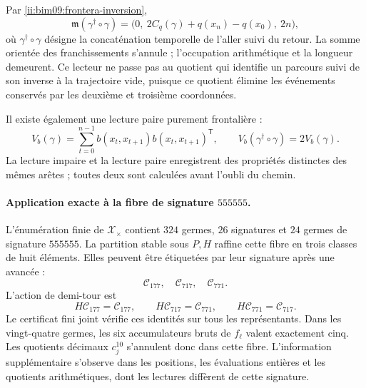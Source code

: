 Par \eqref{ii:bim09:frontera-inversion},
\begin{equation}
 \mathfrak m(\gamma^\dagger\circ\gamma)=
 \bigl(0,\ 2C_q(\gamma)+q(x_n)-q(x_0),\ 2n\bigr),
 \label{ii:bim09:memoria-retorno}
\end{equation}
où $\gamma^\dagger\circ\gamma$ désigne la concaténation temporelle
de l'aller suivi du retour. La somme orientée des franchissements s'annule ;
l'occupation arithmétique et la longueur demeurent. Ce lecteur ne
passe pas au quotient qui identifie un parcours suivi de son inverse
à la trajectoire vide, puisque ce quotient élimine les événements
conservés par les deuxième et troisième coordonnées.

Il existe également une lecture paire purement frontalière :
\[
 V_b(\gamma)=\sum_{t=0}^{n-1}
 b(x_t,x_{t+1})b(x_t,x_{t+1})^{\mathsf T},\qquad
 V_b(\gamma^\dagger\circ\gamma)=2V_b(\gamma).
\]
La lecture impaire et la lecture paire enregistrent des propriétés distinctes des
mêmes arêtes ; toutes deux sont calculées avant l'oubli du chemin.

\paragraph{Application exacte à la fibre de signature \texorpdfstring{$555555$}{555555}.}

L'énumération finie de $\mathscr X_\times$ contient $324$ germes,
$26$ signatures et $24$ germes de signature $555555$. La partition stable
sous $P,H$ raffine cette fibre en trois classes de huit éléments. Elles peuvent
être étiquetées par leur signature après une avancée :
\[
 \mathscr C_{177},\quad\mathscr C_{717},\quad\mathscr C_{771}.
\]
L'action de demi-tour est
\[
 H\mathscr C_{177}=\mathscr C_{177},\qquad
 H\mathscr C_{717}=\mathscr C_{771},\qquad
 H\mathscr C_{771}=\mathscr C_{717}.
\]
Le certificat fini joint vérifie ces identités sur tous les
représentants. Dans les vingt-quatre germes, les six accumulateurs
bruts de $f_\ell$ valent exactement cinq. Les quotients
décimaux $c_j^{10}$ s'annulent donc dans cette fibre. L'information supplémentaire
s'observe dans les positions, les évaluations entières et les quotients
arithmétiques, dont les lectures diffèrent de cette signature.

